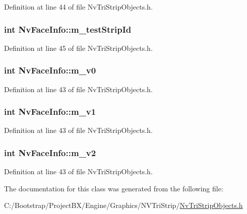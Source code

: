 Definition at line 44 of file NvTriStripObjects.h.\hypertarget{class_nv_face_info_40771ba143905835be0db404c7a8d92c}{
\subsubsection[{m\_\-testStripId}]{\setlength{\rightskip}{0pt plus 5cm}int {\bf NvFaceInfo::m\_\-testStripId}}}
\label{class_nv_face_info_40771ba143905835be0db404c7a8d92c}




Definition at line 45 of file NvTriStripObjects.h.\hypertarget{class_nv_face_info_699f61c4fd052ec4e4f360792ecd251e}{
\subsubsection[{m\_\-v0}]{\setlength{\rightskip}{0pt plus 5cm}int {\bf NvFaceInfo::m\_\-v0}}}
\label{class_nv_face_info_699f61c4fd052ec4e4f360792ecd251e}




Definition at line 43 of file NvTriStripObjects.h.\hypertarget{class_nv_face_info_95048ca744a289e9842f241dc3dbddd8}{
\subsubsection[{m\_\-v1}]{\setlength{\rightskip}{0pt plus 5cm}int {\bf NvFaceInfo::m\_\-v1}}}
\label{class_nv_face_info_95048ca744a289e9842f241dc3dbddd8}




Definition at line 43 of file NvTriStripObjects.h.\hypertarget{class_nv_face_info_39397db282d929de5aa951bb9a453167}{
\subsubsection[{m\_\-v2}]{\setlength{\rightskip}{0pt plus 5cm}int {\bf NvFaceInfo::m\_\-v2}}}
\label{class_nv_face_info_39397db282d929de5aa951bb9a453167}




Definition at line 43 of file NvTriStripObjects.h.

The documentation for this class was generated from the following file:\begin{CompactItemize}
\item 
C:/Bootstrap/ProjectBX/Engine/Graphics/NVTriStrip/\hyperlink{_nv_tri_strip_objects_8h}{NvTriStripObjects.h}\end{CompactItemize}
